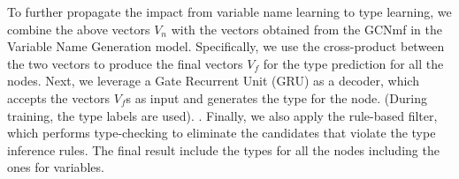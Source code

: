 To further propagate the impact from variable name learning to type
learning, we combine the above vectors $V_n$ with the vectors obtained
from the GCNmf in the Variable Name Generation model. Specifically, we
use the cross-product between the two vectors to produce the final
vectors $V_f$ for the type prediction for all the nodes. Next, we
leverage a Gate Recurrent Unit (GRU) as a decoder, which accepts the
vectors $V_f$s as input and generates the type for the node. (During
training, the type labels are used). {}.
%
Finally, we also apply the rule-based filter, which performs
type-checking to eliminate the candidates that violate the type
inference rules.
%
{}
%
The final result include the types for all the nodes including the
ones for variables.








